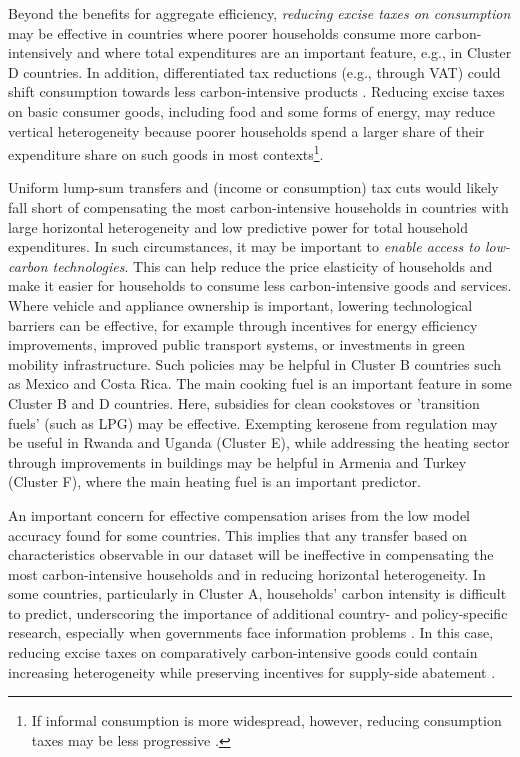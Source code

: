 \documentclass[12pt, a4paper]{article}
\begin{document}
Beyond the benefits for aggregate efficiency, \textit{reducing excise taxes on consumption} may be effective in countries where poorer households consume more carbon-intensively and where total expenditures are an important feature, e.g., in Cluster D countries. In addition, differentiated tax reductions (e.g., through VAT) could shift consumption towards less carbon-intensive products \autocite{Klenert.2023}. Reducing excise taxes on basic consumer goods, including food and some forms of energy, may reduce vertical heterogeneity because poorer households spend a larger share of their expenditure share on such goods in most contexts\footnote{If informal consumption is more widespread, however, reducing consumption taxes may be less progressive \autocite{Bachas.2020}.}. 

Uniform lump-sum transfers and (income or consumption) tax cuts would likely fall short of compensating the most carbon-intensive households in countries with large horizontal heterogeneity and low predictive power for total household expenditures. In such circumstances, it may be important to \textit{enable access to low-carbon technologies}. This can help reduce the price elasticity of households and make it easier for households to consume less carbon-intensive goods and services. Where vehicle and appliance ownership is important, lowering technological barriers can be effective, for example through incentives for energy efficiency improvements, improved public transport systems, or investments in green mobility infrastructure. Such policies may be helpful in Cluster B countries such as Mexico and Costa Rica. %
The main cooking fuel is an important feature in some Cluster B and D countries. Here, subsidies for clean cookstoves or 'transition fuels' (such as LPG) may be effective. Exempting kerosene from regulation may be useful in Rwanda and Uganda (Cluster E), while addressing the heating sector through improvements in buildings may be helpful in Armenia and Turkey (Cluster F), where the main heating fuel is an important predictor. %

An important concern for effective compensation arises from the low model accuracy found for some countries. This implies that any transfer based on characteristics observable in our dataset will be ineffective in compensating the most carbon-intensive households and in reducing horizontal heterogeneity. In some countries, particularly in Cluster A, households' carbon intensity is difficult to predict, underscoring the importance of additional country- and policy-specific research, especially when governments face information problems \autocite{Mirrlees.1971}. In this case, reducing excise taxes on comparatively carbon-intensive goods could contain increasing heterogeneity while preserving incentives for supply-side abatement \autocite{Goulder.2008}.
\end{document}
